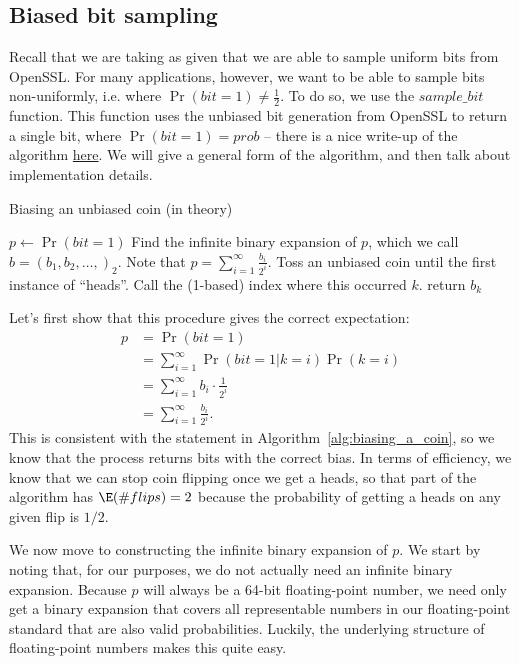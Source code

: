 \documentclass[11pt]{scrartcl} %
\begin{document}
\subsection{Biased bit sampling}
Recall that we are taking as given that we are able to sample uniform bits from OpenSSL.
For many applications, however, we want to be able to sample bits non-uniformly,
i.e. where $\Pr(bit = 1) \neq \frac{1}{2}$. To do so, we use the $sample\_bit$ function.
This function uses the unbiased bit generation from OpenSSL to return a single bit, where $\Pr(bit = 1) = prob$ --
there is a nice write-up of the algorithm \href{https://amakelov.wordpress.com/2013/10/10/arbitrarily-biasing-a-coin-in-2-expected-tosses/}{here}.
We will give a general form of the algorithm, and then talk about implementation details.
\begin{algorithm}[H]
	\caption{Biasing an unbiased coin (in theory)}
	\label{alg:biasing_a_coin_theory}
	\begin{algorithmic}[1]
		\State $p \gets \Pr(bit = 1)$
		\State Find the infinite binary expansion of $p$, which we call $b = (b_1, b_2, \hdots,)_2$.
		Note that $p = \sum_{i=1}^{\infty}\frac{b_i}{2^i}$.
		\State Toss an unbiased coin until the first instance of ``heads''. Call the (1-based) index where this occurred $k$.
		\State return $b_k$
	\end{algorithmic}
\end{algorithm}
Let's first show that this procedure gives the correct expectation:
\begin{align*}
	p &= \Pr(bit = 1) \\
		 &= \sum_{i=1}^{\infty} \Pr(bit = 1 \vert k = i) \Pr(k = i) \\
		 &= \sum_{i=1}^{\infty} b_i \cdot \frac{1}{2^i} \\
		 &= \sum_{i=1}^{\infty}\frac{b_i}{2^i}.
\end{align*}
This is consistent with the statement in Algorithm~\ref{alg:biasing_a_coin}, so we know that
the process returns bits with the correct bias.
In terms of efficiency, we know that we can stop coin flipping once we get a heads,
so that part of the algorithm has $\E(\# flips) = 2$ because the probability of getting a heads 
on any given flip is $1/2$. \newline

We now move to constructing the infinite binary expansion of $p$.
We start by noting that, for our purposes, we do not actually need an infinite binary expansion.
Because $p$ will always be a 64-bit floating-point number, we need only get a binary
expansion that covers all representable numbers in our floating-point standard that are
also valid probabilities.
Luckily, the underlying structure of floating-point numbers makes this quite easy. \newline
\end{document}
